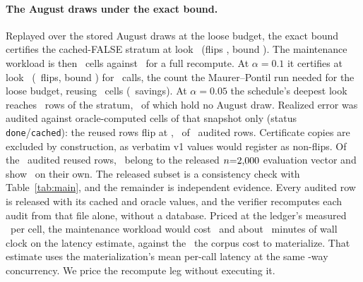 \paragraph{The August draws under the exact bound.} Replayed over the
stored August draws at the loose budget, the exact bound certifies the
cached-FALSE
stratum at look \deployLookLoose\ (flips \deployFlipsLoose,
bound \deployBoundLoose). The maintenance workload is then
\deployMaintCells\ cells against \deployN\ for a full recompute.
At $\alpha{=}0.1$ it certifies at look \deployLookTight\
(\deployFlipsTight\ flips, bound \deployBoundTight) for
\deployOracleTight\ calls, the count the Maurer--Pontil run needed for
the loose budget, reusing \deployReusedTight\ cells
(\deploySavingsTight\ savings). At $\alpha{=}0.05$ the schedule's
deepest look reaches \deployAugustFiveLook\ rows of the stratum,
\deployAugustFiveMissing\ of which hold no August draw. Realized error
was audited against oracle-computed cells of that snapshot only
(status \texttt{done}/\texttt{cached}): the reused rows flip at
\deployRealized, \deployAuditFlips\ of \deployOverlap\ audited rows.
Certificate copies are excluded by construction, as verbatim v1 values
would register as non-flips. Of the \deployOverlap\ audited reused rows,
\deployAuditReleased\ belong to the released $n{=}2{,}000$
evaluation vector and show \deployAuditReleasedErr\ on their own. The
released subset is a consistency check with Table~\ref{tab:main}, and
the remainder is independent evidence. Every audited row is released
with its cached and oracle values, and the verifier recomputes each
audit from that file alone, without a database.
Priced at the ledger's measured \perCellCost\ per cell, the
maintenance workload would cost \deployMaintCost\ and about
\deployMaintMinutes\ minutes of wall clock on the latency estimate,
against the \deployMatCost\ the corpus cost to materialize. That
estimate uses the materialization's mean per-call latency at the same
\deployConcurrency-way concurrency. We price the recompute leg without
executing it.

\keeprunin
